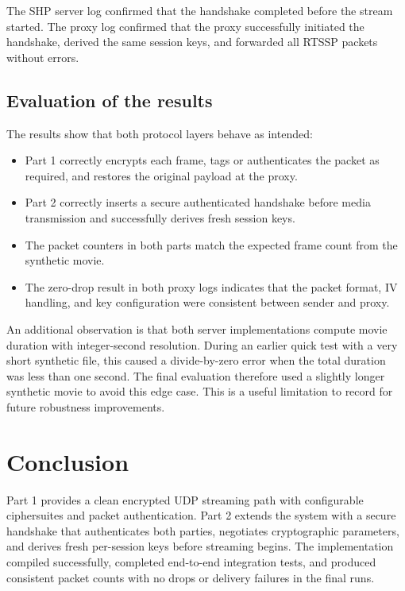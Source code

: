 \documentclass[11pt,a4paper]{article}
\begin{document}
The SHP server log confirmed that the handshake completed before the stream started. The proxy log confirmed that the proxy successfully initiated the handshake, derived the same session keys, and forwarded all RTSSP packets without errors.

\subsection{Evaluation of the results}
The results show that both protocol layers behave as intended:
\begin{itemize}[leftmargin=1.2em]
  \item Part 1 correctly encrypts each frame, tags or authenticates the packet as required, and restores the original payload at the proxy.
  \item Part 2 correctly inserts a secure authenticated handshake before media transmission and successfully derives fresh session keys.
  \item The packet counters in both parts match the expected frame count from the synthetic movie.
  \item The zero-drop result in both proxy logs indicates that the packet format, IV handling, and key configuration were consistent between sender and proxy.
\end{itemize}

An additional observation is that both server implementations compute movie duration with integer-second resolution. During an earlier quick test with a very short synthetic file, this caused a divide-by-zero error when the total duration was less than one second. The final evaluation therefore used a slightly longer synthetic movie to avoid this edge case. This is a useful limitation to record for future robustness improvements.

\section{Conclusion}
Part 1 provides a clean encrypted UDP streaming path with configurable ciphersuites and packet authentication. Part 2 extends the system with a secure handshake that authenticates both parties, negotiates cryptographic parameters, and derives fresh per-session keys before streaming begins. The implementation compiled successfully, completed end-to-end integration tests, and produced consistent packet counts with no drops or delivery failures in the final runs.
\end{document}
